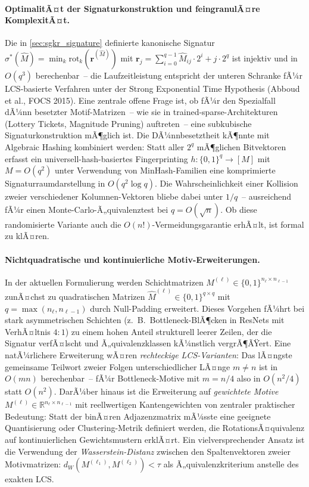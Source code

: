 ﻿\documentclass[12pt, a4paper, openany]{report}
\newcommand{\R}{\mathbb{R}}
\begin{document}
\paragraph{OptimalitÃ¤t der Signaturkonstruktion und feingranulÃ¤re KomplexitÃ¤t.}
Die in \cref{sec:sgkr_signature} definierte kanonische Signatur
$\sigma^*(\hat{M}) = \min_{k} \mathrm{rot}_k(\bm{r}^{(\hat{M})})$ mit
$\bm{r}_j = \sum_{i=0}^{q-1} \hat{M}_{ij}\cdot 2^i + j\cdot 2^q$
ist injektiv und in $O(q^3)$ berechenbar~-- die Laufzeitleistung entspricht
der unteren Schranke fÃ¼r LCS-basierte Verfahren unter der Strong Exponential
Time Hypothesis (Abboud et al., FOCS 2015).  Eine zentrale offene Frage ist,
ob fÃ¼r den Spezialfall dÃ¼nn besetzter Motif-Matrizen~-- wie sie in
trained-sparse-Architekturen (Lottery Tickets, Magnitude Pruning) auftreten~--
eine subkubische Signaturkonstruktion mÃ¶glich ist.  Die DÃ¼nnbesetztheit kÃ¶nnte
mit Algebraic Hashing kombiniert werden: Statt aller $2^q$ mÃ¶glichen
Bitvektoren erfasst ein universell-hash-basiertes Fingerprinting
$h\colon \{0,1\}^q \to [M]$ mit $M = O(q^2)$ unter Verwendung von
MinHash-Familien eine komprimierte Signaturraumdarstellung in $O(q^2\log q)$.
Die Wahrscheinlichkeit einer Kollision zweier verschiedener Kolumnen-Vektoren
bliebe dabei unter $1/q$~-- ausreichend fÃ¼r einen Monte-Carlo-Ã„quivalenztest
bei $q = O(\sqrt{n})$.  Ob diese randomisierte Variante auch die
$O(n!)$-Vermeidungsgarantie erhÃ¤lt, ist formal zu klÃ¤ren.

\paragraph{Nichtquadratische und kontinuierliche Motiv-Erweiterungen.}
In der aktuellen Formulierung werden Schichtmatrizen $M^{(\ell)} \in
\{0,1\}^{n_\ell \times n_{\ell-1}}$ zunÃ¤chst zu quadratischen Matrizen
$\hat{M}^{(\ell)} \in \{0,1\}^{q\times q}$ mit $q = \max(n_\ell, n_{\ell-1})$
durch Null-Padding erweitert.  Dieses Vorgehen fÃ¼hrt bei stark asymmetrischen
Schichten (z.~B.\ Bottleneck-BlÃ¶cken in ResNets mit VerhÃ¤ltnis $4:1$) zu
einem hohen Anteil strukturell leerer Zeilen, der die Signatur verfÃ¤lscht
und Ã„quivalenzklassen kÃ¼nstlich vergrÃ¶ÃŸert.  Eine natÃ¼rlichere Erweiterung
wÃ¤ren \emph{rechteckige LCS-Varianten}: Das lÃ¤ngste gemeinsame Teilwort
zweier Folgen unterschiedlicher LÃ¤nge $m \neq n$ ist in $O(mn)$ berechenbar~--
fÃ¼r Bottleneck-Motive mit $m = n/4$ also in $O(n^2/4)$ statt $O(n^2)$.
DarÃ¼ber hinaus ist die Erweiterung auf \emph{gewichtete Motive}
$M^{(\ell)} \in \R^{n_\ell \times n_{\ell-1}}$ mit reellwertigen
Kantengewichten von zentraler praktischer Bedeutung: Statt der binÃ¤ren
Adjazenzmatrix mÃ¼sste eine geeignete Quantisierung oder Clustering-Metrik
definiert werden, die RotationsÃ¤quivalenz auf kontinuierlichen Gewichtsmustern
erklÃ¤rt.  Ein vielversprechender Ansatz ist die Verwendung der
\emph{Wasserstein-Distanz} zwischen den Spaltenvektoren zweier
Motivmatrizen: $d_W(M^{(\ell_1)}, M^{(\ell_2)}) < \tau$ als
Ã„quivalenzkriterium anstelle des exakten LCS.
\end{document}
